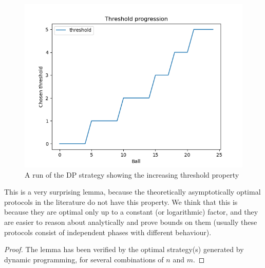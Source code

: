 \begin{figure}[h] \label{dp-increasing-threshold}
    \centering
    \includegraphics[scale=0.6]{Chapter4/Figs/dp_increasing_threshold.png}
    \caption{A run of the DP strategy showing the increasing threshold property}
\end{figure}
This is a very surprising lemma, because the theoretically asymptotically optimal protocols in the literature do not have this property. We think that this is because they are optimal only up to a constant (or logarithmic) factor, and they are easier to reason about analytically and prove bounds on them (usually these protocols consist of independent phases with different behaviour).


\begin{proof}


The lemma has been verified by the optimal strategy(s) generated by dynamic programming, for several combinations of $n$ and $m$. 
\end{proof}

